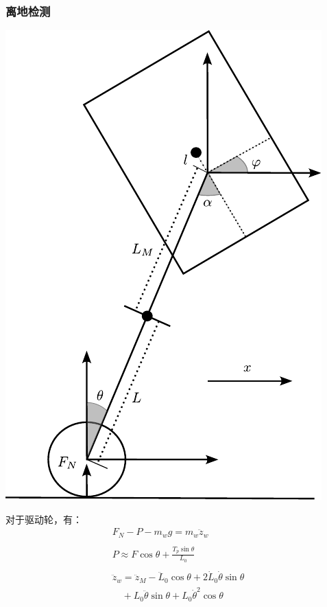 \documentclass{beamer}
\begin{document}
	
	\begin{frame}
		\frametitle{离地检测}
			\begin{minipage}[t]{0.5\linewidth}
			\vspace{-\baselineskip} %
			\centering
			\includegraphics[width=0.8\linewidth]{img/chapter5/ground.pdf} %
		\end{minipage}%
		\hfill %
		\begin{minipage}[t]{0.4\linewidth}
		\vspace{25pt}
		对于驱动轮，有：
		\[
		\begin{aligned}
			F_N - P - m_w g = m_w \ddot{z}_w \\ \\
			P \approx F \cos{\theta} + \frac{T_p \sin{\theta}}{L_0} \\ \\
			\ddot{z}_w = \ddot{z}_M - \ddot{L}_0 \cos{\theta} + 2 \dot{L}_0 \dot{\theta} \sin{\theta} \\ 
			\quad + L_0 \ddot{\theta} \sin{\theta} + L_0 \dot{\theta}^2 \cos{\theta}
		\end{aligned}
		\]

		\end{minipage}
	\end{frame}
	
\end{document}
